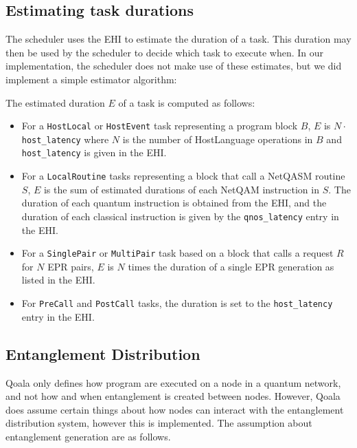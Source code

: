 \subsection{Estimating task durations}
The scheduler uses the EHI to estimate the duration of a task.
This duration may then be used by the scheduler to decide which task to execute when.
In our implementation, the scheduler does not make use of these estimates, but we did implement a simple estimator algorithm:

The estimated duration $E$ of a task is computed as follows:
\begin{itemize}
    \item For a \texttt{HostLocal} or \texttt{HostEvent} task representing a program block $B$, $E$ is $N \cdot$ \texttt{host\_latency} where $N$ is the number of HostLanguage operations in $B$ and \texttt{host\_latency} is given in the EHI.
    \item For a \texttt{LocalRoutine} tasks representing a block that call a NetQASM routine $S$, 
        $E$ is the sum of estimated durations of each NetQAM instruction in $S$. The duration of each quantum instruction is obtained from the EHI, and the duration of each classical instruction is given by the \texttt{qnos\_latency} entry in the EHI.
    \item For a \texttt{SinglePair} or \texttt{MultiPair} task based on a block that calls a request $R$ for $N$ EPR pairs, $E$ is $N$ times the duration of a single EPR generation as listed in the EHI.
    \item For \texttt{PreCall} and \texttt{PostCall} tasks, the duration is set to the \texttt{host\_latency} entry in the EHI.
\end{itemize}






\subsection{Entanglement Distribution}
\label{qoala:sec:app:entanglement_distribution}
Qoala only defines how program are executed on a node in a quantum network,
and not how and when entanglement is created between nodes.
However, Qoala does assume certain things about how nodes can interact with the entanglement distribution system, however this is implemented.
The assumption about entanglement generation are as follows.

